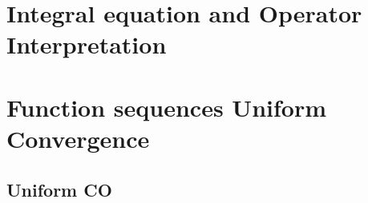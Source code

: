 \documentclass[11pt]{article}
\newcommand{\1}{\mathbf{1}}
\newcommand{\0}{\mathbf{0}}
\begin{document}
\section{Integral equation and Operator Interpretation}
\section{Function sequences Uniform Convergence}
\subsection{Uniform CO}
\end{document}
